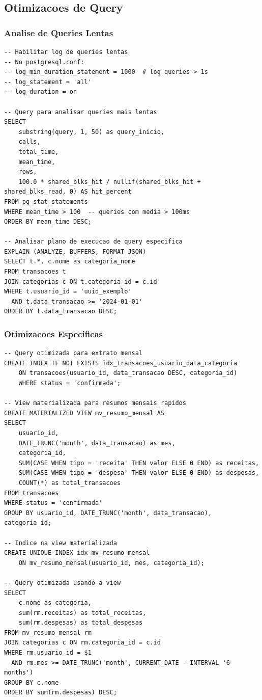\subsection{Otimizacoes de Query}

\subsubsection{Analise de Queries Lentas}

\begin{lstlisting}[caption=Identificacao de queries problematicas]
-- Habilitar log de queries lentas
-- No postgresql.conf:
-- log_min_duration_statement = 1000  # log queries > 1s
-- log_statement = 'all'
-- log_duration = on

-- Query para analisar queries mais lentas
SELECT 
    substring(query, 1, 50) as query_inicio,
    calls,
    total_time,
    mean_time,
    rows,
    100.0 * shared_blks_hit / nullif(shared_blks_hit + shared_blks_read, 0) AS hit_percent
FROM pg_stat_statements 
WHERE mean_time > 100  -- queries com media > 100ms
ORDER BY mean_time DESC;

-- Analisar plano de execucao de query especifica
EXPLAIN (ANALYZE, BUFFERS, FORMAT JSON) 
SELECT t.*, c.nome as categoria_nome
FROM transacoes t
JOIN categorias c ON t.categoria_id = c.id
WHERE t.usuario_id = 'uuid_exemplo'
  AND t.data_transacao >= '2024-01-01'
ORDER BY t.data_transacao DESC;
\end{lstlisting}

\subsubsection{Otimizacoes Especificas}

\begin{lstlisting}[caption=Queries otimizadas para casos comuns]
-- Query otimizada para extrato mensal
CREATE INDEX IF NOT EXISTS idx_transacoes_usuario_data_categoria 
    ON transacoes(usuario_id, data_transacao DESC, categoria_id)
    WHERE status = 'confirmada';

-- View materializada para resumos mensais rapidos
CREATE MATERIALIZED VIEW mv_resumo_mensal AS
SELECT 
    usuario_id,
    DATE_TRUNC('month', data_transacao) as mes,
    categoria_id,
    SUM(CASE WHEN tipo = 'receita' THEN valor ELSE 0 END) as receitas,
    SUM(CASE WHEN tipo = 'despesa' THEN valor ELSE 0 END) as despesas,
    COUNT(*) as total_transacoes
FROM transacoes
WHERE status = 'confirmada'
GROUP BY usuario_id, DATE_TRUNC('month', data_transacao), categoria_id;

-- Indice na view materializada
CREATE UNIQUE INDEX idx_mv_resumo_mensal 
    ON mv_resumo_mensal(usuario_id, mes, categoria_id);

-- Query otimizada usando a view
SELECT 
    c.nome as categoria,
    sum(rm.receitas) as total_receitas,
    sum(rm.despesas) as total_despesas
FROM mv_resumo_mensal rm
JOIN categorias c ON rm.categoria_id = c.id
WHERE rm.usuario_id = $1
  AND rm.mes >= DATE_TRUNC('month', CURRENT_DATE - INTERVAL '6 months')
GROUP BY c.nome
ORDER BY sum(rm.despesas) DESC;
\end{lstlisting}

